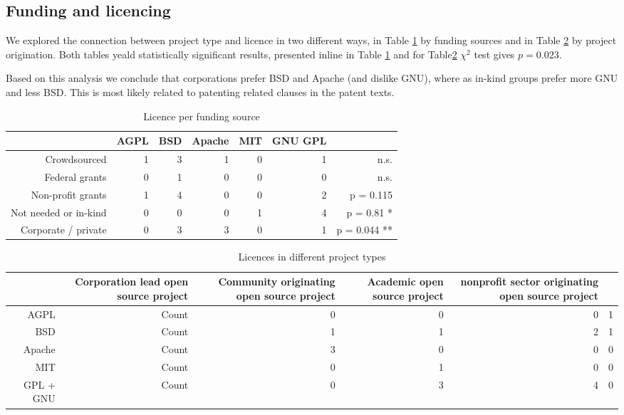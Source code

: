 \subsection{Funding and licencing}

We explored the connection between project type and licence in two different ways, in Table \ref{tab:licence_per_fudning} by funding sources and in Table \ref{tab:licence_per_project_type} by project origination. Both tables yeald statistically significant results, presented inline in Table \ref{tab:licence_per_fudning} and for Table\ref{tab:licence_per_project_type} $\chi^2$ test gives $p=0.023$.

Based on this analysis we conclude that corporations prefer BSD and Apache (and dislike GNU), where as in-kind groups prefer more GNU and less BSD. This is most likely related to patenting related clauses in the patent texts.

\begin{table}[htbp]
  \centering
  \caption{Licence per funding source}
    \begin{tabular}{rrrrrrr}
    \toprule
          & AGPL  & BSD   & Apache & MIT   & GNU GPL &  \\
    \midrule
    Crowdsourced & 1     & 3     & 1     & 0     & 1     & n.s. \\
    Federal grants & 0     & 1     & 0     & 0     & 0     & n.s. \\
    Non-profit grants & 1     & 4     & 0     & 0     & 2     & p = 0.115 \\
    Not needed or in-kind & 0     & 0     & 0     & 1     & 4     & p = 0.81 * \\
    Corporate / private & 0     & 3     & 3     & 0     & 1     & p = 0.044 ** \\
    \bottomrule
    \end{tabular}
  \label{tab:licence_per_fudning}
\end{table}

\begin{table}[htbp]
  \centering
  \caption{Licences in different project types}
    \begin{tabular}{rrrrrr}
    \toprule
          & Corporation lead open source project & Community originating open source project & Academic open source project & nonprofit sector originating open source project &  \\
    \midrule
    AGPL  & Count & 0     & 0     & 0     & 1 \\
    BSD   & Count & 1     & 1     & 2     & 1 \\
    Apache & Count & 3     & 0     & 0     & 0 \\
    MIT   & Count & 0     & 1     & 0     & 0 \\
    GPL + GNU & Count & 0     & 3     & 4     & 0 \\
    \bottomrule
    \end{tabular}
  \label{tab:licence_per_project_type}
\end{table}%